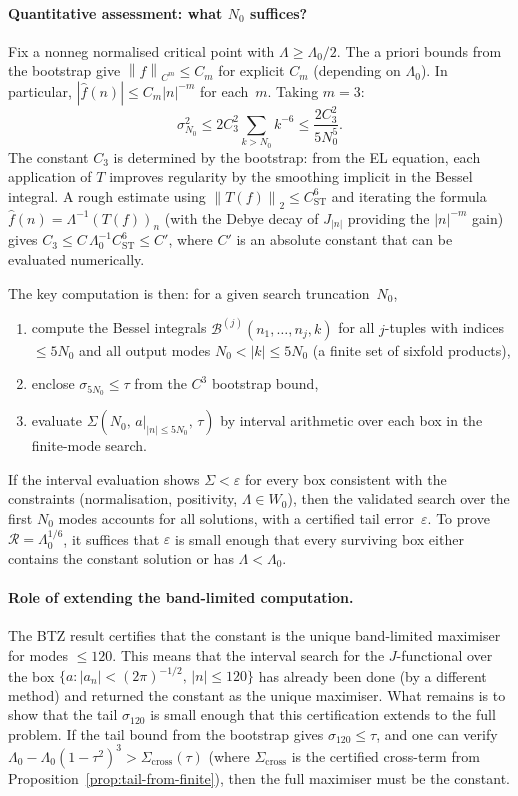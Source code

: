 \documentclass[12pt]{article}
\theoremstyle{definition}
\theoremstyle{remark}
\newcommand{\wh}{\widehat}
\newcommand{\norm}[1]{\left\|#1\right\|}
\begin{document}
\paragraph{Quantitative assessment: what $N_0$ suffices?}
Fix a nonneg normalised critical point with $\Lambda\geq\Lambda_0/2$.
The a priori bounds from the bootstrap give $\norm{f}_{C^m}\leq C_m$ for
explicit $C_m$ (depending on $\Lambda_0$).  In particular,
$|\wh f(n)|\leq C_m|n|^{-m}$ for each~$m$.  Taking $m=3$:
\[
  \sigma_{N_0}^2\leq 2C_3^2\sum_{k>N_0}k^{-6}
  \leq\frac{2C_3^2}{5N_0^5}.
\]
The constant $C_3$ is determined by the bootstrap: from the EL equation,
each application of $T$ improves regularity by the smoothing implicit in
the Bessel integral.  A rough estimate using
$\norm{T(f)}_2\leq C_{\mathrm{ST}}^6$ and iterating the formula
$\wh f(n)=\Lambda^{-1}(T(f))_n$ (with the Debye decay of $J_{|n|}$
providing the $|n|^{-m}$ gain) gives $C_3\leq C\,\Lambda_0^{-1}
C_{\mathrm{ST}}^6\leq C'$, where $C'$ is an absolute constant that
can be evaluated numerically.

The key computation is then: for a given search truncation~$N_0$,
\begin{enumerate}[leftmargin=2em]
  \item compute the Bessel integrals
    $\mathcal B^{(j)}(n_1,\ldots,n_j,k)$ for all $j$-tuples with
    indices $\leq 5N_0$ and all output modes $N_0<|k|\leq 5N_0$
    (a finite set of sixfold products),
  \item enclose $\sigma_{5N_0}\leq\tau$ from the $C^3$ bootstrap bound,
  \item evaluate $\Sigma(N_0,\,a|_{|n|\leq 5N_0},\,\tau)$ by interval
    arithmetic over each box in the finite-mode search.
\end{enumerate}
If the interval evaluation shows $\Sigma<\varepsilon$ for every box
consistent with the constraints (normalisation, positivity,
$\Lambda\in W_0$), then the validated search over the first $N_0$ modes
accounts for all solutions, with a certified tail error~$\varepsilon$.
To prove $\mathcal R=\Lambda_0^{1/6}$, it suffices that $\varepsilon$
is small enough that every surviving box either contains the constant
solution or has $\Lambda<\Lambda_0$.

\paragraph{Role of extending the band-limited computation.}
The BTZ result certifies that the constant is the unique band-limited
maximiser for modes $\leq 120$.  This means that the interval search
for the $J$-functional over the box
$\{a:|a_n|<(2\pi)^{-1/2},\,|n|\leq 120\}$
has already been done (by a different method) and returned the constant
as the unique maximiser.  What remains is to show that the tail
$\sigma_{120}$ is small enough that this certification extends to the
full problem.  If the tail bound from the bootstrap gives
$\sigma_{120}\leq\tau$, and one can verify
$\Lambda_0-\Lambda_0(1-\tau^2)^3>\Sigma_{\mathrm{cross}}(\tau)$
(where $\Sigma_{\mathrm{cross}}$ is the certified cross-term from
Proposition~\ref{prop:tail-from-finite}), then the full maximiser must
be the constant.
\end{document}
